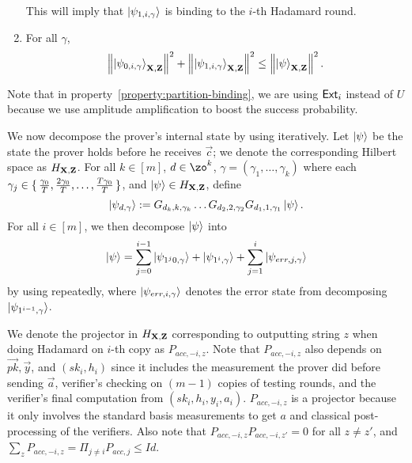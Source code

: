 \begin{lemma}
\begin{enumerate}
			This will imply that $\ket{\psi_{1,i,\gamma}}$ is binding to the $i$-th Hadamard round.

		\item \label{property-partition-norm-sum}
			For all $\gamma$,
			\begin{align}
				\left\lVert\ket{\psi_{0,i,\gamma}}_{\mathbf{X},\mathbf{Z}}\right\rVert^2+ \left\lVert\ket{\psi_{1,i,\gamma}}_{\mathbf{X},\mathbf{Z}}\right\rVert^2 \leq  \left\lVert\ket{\psi}_{\mathbf{X},\mathbf{Z}}\right\rVert^2.
			\end{align}
	\end{enumerate}
\end{lemma}

Note that in property~\ref{property:partition-binding}, we are using $\mathsf{Ext}_i$ instead of $U$ because we use amplitude amplification to boost the success probability. 

We now decompose the prover's internal state by using  iteratively.
Let $\ket{\psi}$ be the state the prover holds before he receives $\vec{c}$;
we denote the corresponding Hilbert space as $H_{\mathbf{X},\mathbf{Z}}$.
For all $k \in [m]$, $d\in \zo^k$, $\gamma=(\gamma_1, \ldots, \gamma_k)$ where each $\gamma_j\in\set{\frac{\gamma_0}{T},\frac{2\gamma_0}{T},\dots,\frac{T\gamma_0}{T}}$,  
and $\ket{\psi} \in H_{\mathbf{X},\mathbf{Z}}$, define $$\ket{\psi_{d,\gamma}}:= G_{d_k,k,\gamma_k}\ldots G_{d_2,2,\gamma_2} G_{d_1,1,\gamma_1} \ket{\psi}.$$
For all $i\in[m]$, we then decompose $\ket{\psi}$ into
\begin{equation}
	\label{eq:partition-string}
	\ket{\psi}=\sum_{j=0}^{i-1} \ket{\psi_{1^j0,\gamma}} +\ket{\psi_{1^i,\gamma}} +\sum_{j=1}^{i}\ket{\psi_{err,j,\gamma}}
\end{equation}
by using  repeatedly,  where $\ket{\psi_{err,i,\gamma}}$ denotes the error state from decomposing $\ket{\psi_{1^{i-1},\gamma}}$.

We denote the projector in $H_{\mathbf{X},\mathbf{Z}}$ corresponding to outputting string $z$ when doing Hadamard on $i$-th copy as $P_{acc,-i,z}$.
Note that $P_{acc,-i,z}$ also depends on $\vec{pk}, \vec{y}$, and $(sk_i, h_i)$ since it includes the measurement the prover did before sending $\vec{a}$,  verifier's checking on $(m-1)$ copies of testing rounds, and  the verifier's final computation from $(sk_i,h_i,y_i,a_i)$. $P_{acc,-i,z}$ is a projector because it only involves the standard basis measurements to get $a$ and classical post-processing of the verifiers. Also note that  $P_{acc,-i,z} P_{acc,-i,z'}=0$ for all $z\neq z'$, and $\sum_z P_{acc,-i,z} =\Pi_{j \neq i} P_{acc,j}\leq Id$.

